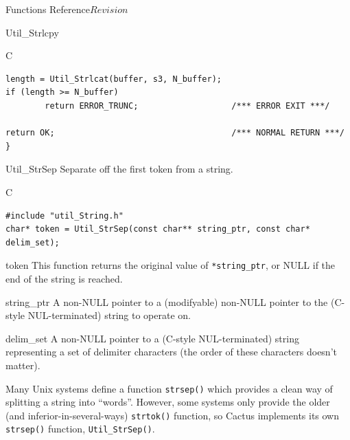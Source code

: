 \begin{cactuspart}{ Functions Reference}{}{$Revision$}
\begin{FunctionDescription}{Util\_Strlcpy}
\begin{ExampleSection}
\begin{Example}{C}
\begin{verbatim}
length = Util_Strlcat(buffer, s3, N_buffer);
if (length >= N_buffer)
        return ERROR_TRUNC;                   /*** ERROR EXIT ***/

return OK;                                    /*** NORMAL RETURN ***/
}
\end{verbatim}
\end{Example}
\end{ExampleSection}
\end{FunctionDescription}


\begin{FunctionDescription}{Util\_StrSep}
\label{Util-StrSep}
Separate off the first token from a string.

\begin{SynopsisSection}
\begin{Synopsis}{C}
\begin{verbatim}
#include "util_String.h"
char* token = Util_StrSep(const char** string_ptr, const char* delim_set);
\end{verbatim}
\end{Synopsis}
\end{SynopsisSection}

\begin{ResultSection}
\begin{Result}{token}
This function returns the original value of \verb|*string_ptr|,
or NULL if the end of the string is reached.
\end{Result}
\end{ResultSection}

\begin{ParameterSection}
\begin{Parameter}{string\_ptr}
A non-NULL pointer to a (modifyable) non-NULL pointer to the
(C-style NUL-terminated) string to operate on.
\end{Parameter}
\begin{Parameter}{delim\_set}
A non-NULL pointer to a (C-style NUL-terminated) string representing a
set of delimiter characters (the order of these characters doesn't matter).
\end{Parameter}
\end{ParameterSection}

\begin{Discussion}
Many Unix systems define a function \verb|strsep()| which provides
a clean way of splitting a string into ``words''.  However, some
systems only provide the older (and inferior-in-several-ways)
\verb|strtok()| function, so Cactus implements its own \verb|strsep()|
function, \verb|Util_StrSep()|.


\end{Discussion}
\end{FunctionDescription}
\end{cactuspart}
